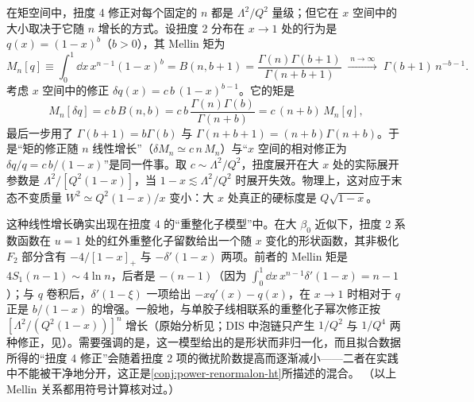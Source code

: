 \begin{example}\label{ex:power-twist4-largex}
在矩空间中，扭度 4 修正对每个固定的 $n$ 都是 $\Lambda^2/Q^2$ 量级；但它在 $x$ 空间中的大小取决于它随 $n$ 增长的方式。设扭度 2 分布在 $x\to1$ 处的行为是 $q(x)=(1-x)^b$（$b>0$），其 Mellin 矩为
\begin{equation*}
M_n[q]\equiv\int_0^1\!\dd x\,x^{n-1}(1-x)^b=B(n,b+1)=\frac{\Gamma(n)\Gamma(b+1)}{\Gamma(n+b+1)}\;\xrightarrow{\;n\to\infty\;}\;\Gamma(b+1)\,n^{-b-1}.
\end{equation*}
考虑 $x$ 空间中的修正 $\delta q(x)=c\,b\,(1-x)^{b-1}$。它的矩是
\begin{equation*}
M_n[\delta q]=c\,b\,B(n,b)=c\,b\,\frac{\Gamma(n)\Gamma(b)}{\Gamma(n+b)}=c\,(n+b)\,M_n[q],
\end{equation*}
最后一步用了 $\Gamma(b+1)=b\Gamma(b)$ 与 $\Gamma(n+b+1)=(n+b)\Gamma(n+b)$。于是“矩的修正随 $n$ 线性增长”（$\delta M_n\simeq c\,n\,M_n$）与“$x$ 空间的相对修正为 $\delta q/q=c\,b/(1-x)$”是同一件事。取 $c\sim\Lambda^2/Q^2$，扭度展开在大 $x$ 处的实际展开参数是 $\Lambda^2/[Q^2(1-x)]$，当 $1-x\lesssim\Lambda^2/Q^2$ 时展开失效。物理上，这对应于末态不变质量 $W^2\simeq Q^2(1-x)/x$ 变小：大 $x$ 处真正的硬标度是 $Q\sqrt{1-x}$。

这种线性增长确实出现在扭度 4 的“重整化子模型”中。在大 $\beta_0$ 近似下，扭度 2 系数函数在 $u=1$ 处的红外重整化子留数给出一个随 $x$ 变化的形状函数，其非极化 $F_2$ 部分含有 $-4/[1-x]_+$ 与 $-\delta'(1-x)$ 两项\cite[式~(5.33)]{Beneke1999}。前者的 Mellin 矩是 $4S_1(n-1)\sim4\ln n$，后者是 $-(n-1)$（因为 $\int_0^1\dd x\,x^{n-1}\delta'(1-x)=n-1$）；与 $q$ 卷积后，$\delta'(1-\xi)$ 一项给出 $-xq'(x)-q(x)$，在 $x\to1$ 时相对于 $q$ 正是 $b/(1-x)$ 的增强。一般地，与单胶子线相联系的重整化子幂次修正按 $[\Lambda^2/(Q^2(1-x))]^n$ 增长\cite[式~(5.37)]{Beneke1999}（原始分析见\cite{BenekeBraun1995b}；DIS 中泡链只产生 $1/Q^2$ 与 $1/Q^4$ 两种修正，见\cite{DasguptaWebber1996}）。需要强调的是，这一模型给出的是形状而非归一化，而且拟合数据所得的“扭度 4 修正”会随着扭度 2 项的微扰阶数提高而逐渐减小——二者在实践中不能被干净地分开\cite[第~5.2.4~节]{Beneke1999}，这正是\cref{conj:power-renormalon-ht}所描述的混合。
（以上 Mellin 关系都用符号计算核对过。）
\end{example}
